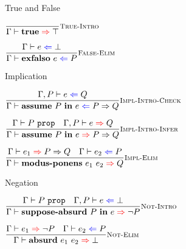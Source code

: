 \documentclass{beamer}
\begin{document}
\begin{frame}{True and False}

\begin{center}
  $\infrule[True-Intro]{}{\proofinfer{\trueintro}{\True}}$

  \vspace{2em}

  $\infrule[False-Elim]{\proofcheck{e}{\False}}{\proofcheck{\falseelim{e}}{P}}$
\end{center}

\end{frame}

\begin{frame}{Implication}

\begin{center}
  $\infrule[Impl-Intro-Check]{\proofcheck[\assume{\Gamma}{P}]{e}{Q}}{\proofcheck{\implintro{P}{e}}{\Impl{P}{Q}}}$

  \vspace{2em}

  $\infrule[Impl-Intro-Infer]{\prop[\Gamma]{P} \quad \proofinfer[\assume{\Gamma}{P}]{e}{Q}}{\proofinfer{\implintro{P}{e}}{\Impl{P}{Q}}}$

  \vspace{2em}

  $\infrule[Impl-Elim]{\proofinfer{e_1}{\Impl{P}{Q}} \quad \proofcheck{e_2}{P}}{\proofinfer{\implelim{e_1}{e_2}}{Q}}$
\end{center}

\end{frame}

\begin{frame}{Negation}

\begin{center}
  $\infrule[Not-Intro]{\prop[\Gamma]{P} \quad \proofcheck[\assume{\Gamma}{P}]{e}{\False}}{\proofinfer{\notintro{P}{e}}{\Not{P}}}$

  \vspace{2em}

  $\infrule[Not-Elim]{\proofinfer{e_1}{\Not{P}} \quad \proofcheck{e_2}{P}}{\proofinfer{\notelim{e_1}{e_2}}{\False}}$
\end{center}

\end{frame}
\end{document}
